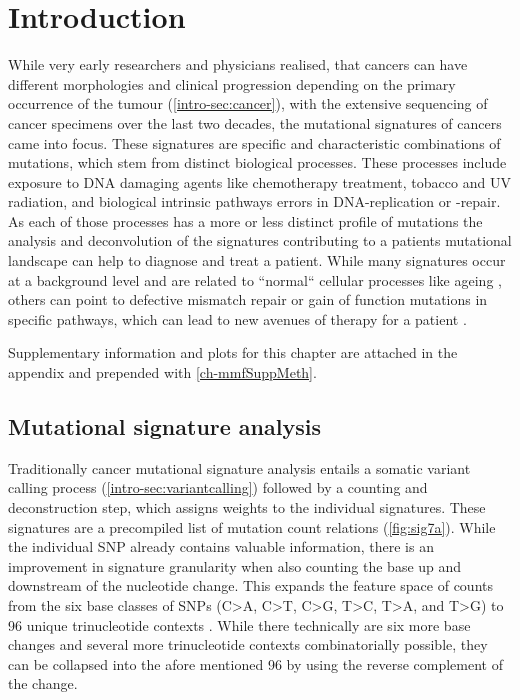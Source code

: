 \section{Introduction}
\label{mmf-sec:intro}

While very early researchers and physicians realised, that cancers can have different morphologies and clinical progression depending on the primary occurrence of the tumour (\autoref{intro-sec:cancer}), with the extensive sequencing of cancer specimens over the last two decades, the mutational signatures of cancers came into focus. These signatures are specific and characteristic combinations of mutations, which stem from distinct biological processes. These processes include exposure to DNA damaging agents like chemotherapy treatment, tobacco and UV radiation, and biological intrinsic pathways errors in DNA-replication or -repair. As each of those processes has a more or less distinct profile of mutations \cite{Hollstein1991,Kucab2019} the analysis and deconvolution of the signatures contributing to a patients mutational landscape can help to diagnose and treat a patient. While many signatures occur at a background level and are related to ``normal`` cellular processes like ageing \cite{Alexandrov2013}, others can point to defective mismatch repair or gain of function mutations in specific pathways, which can lead to new avenues of therapy for a patient \cite{Neil2017}.

Supplementary information and plots for this chapter are attached in the appendix and prepended with \ref{ch-mmfSuppMeth}.

\subsection{Mutational signature analysis}
\label{mmf-sec:signatureanalysis}
Traditionally cancer mutational signature analysis entails a somatic variant calling process (\autoref{intro-sec:variantcalling}) followed by a counting and deconstruction step, which assigns weights to the individual signatures. These signatures are a precompiled list of mutation count relations (\autoref{fig:sig7a}). While the individual SNP already contains valuable information, there is an improvement in signature granularity when also counting the base up and downstream of the nucleotide change. This expands the feature space of counts from the six base classes of SNPs (C>A, C>T, C>G, T>C, T>A, and T>G) to 96 unique trinucleotide contexts \cite{Alexandrov2013}. While there technically are six more base changes and several  more trinucleotide contexts combinatorially possible, they can be collapsed into the afore mentioned 96 by using the reverse complement of the change.

